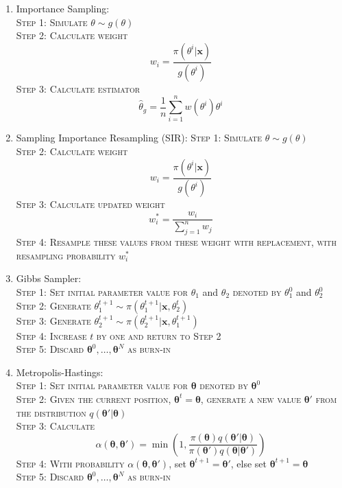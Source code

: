 \documentclass[11pt,a4paper]{article}
\begin{document}
\begin{multicols}{2}
\begin{enumerate}[resume]
\item Importance Sampling: \\
\textsc{Step 1: Simulate} $\theta \sim g(\theta)$ \\
\textsc{Step 2: Calculate weight} $$w_i = \frac{\pi(\theta^i|\boldsymbol x)}{g(\theta^i)}$$
\textsc{Step 3: Calculate estimator} $$\hat\theta_g = \frac{1}{n} \sum_{i=1}^n w(\theta^i) \theta^i$$

\item Sampling Importance Resampling (SIR): 
\textsc{Step 1: Simulate} $\theta \sim g(\theta)$ \\
\textsc{Step 2: Calculate weight} $$w_i = \frac{\pi(\theta^i|\boldsymbol x)}{g(\theta^i)}$$
\textsc{Step 3: Calculate updated weight} $$w_i^* = \frac{w_i}{\sum_{j=1}^n w_j}$$
\textsc{Step 4: Resample these values from these weight with replacement, with resampling probability} $w_i^*$

\item Gibbs Sampler: \\
\textsc{Step 1: Set initial parameter value for} $\theta_1$ and $\theta_2$ \textsc{denoted by} $\theta_1^0$ and $\theta_2^0$ \\
\textsc{Step 2: Generate} $\theta_1^{t+1} \sim \pi(\theta_1^{t+1} | \boldsymbol x, \theta_2^t)$ \\
\textsc{Step 3: Generate} $\theta_2^{t+1} \sim \pi(\theta_2^{t+1} | \boldsymbol x, \theta_1^{t+1})$ \\
\textsc{Step 4: Increase} $t$ \textsc{by one and return to Step 2} \\
\textsc{Step 5: Discard} $\boldsymbol\theta^0, \ldots, \boldsymbol\theta^N$ \textsc{as burn-in}

\item Metropolis-Hastings: \\
\textsc{Step 1: Set initial parameter value for} $\boldsymbol\theta$ \textsc{denoted by} $\boldsymbol\theta^0$ \\
\textsc{Step 2: Given the current position}, $\boldsymbol\theta^t = \boldsymbol\theta$, \textsc{generate a new value} $\boldsymbol\theta'$ \textsc{from the distribution} $q(\boldsymbol\theta'|\boldsymbol\theta)$ \\
\textsc{Step 3: Calculate} 
$$\alpha(\boldsymbol\theta, \boldsymbol\theta') = \min \left( 1, \frac{\pi(\boldsymbol\theta) q(\boldsymbol\theta'|\boldsymbol\theta)}{\pi(\boldsymbol\theta') q(\boldsymbol\theta|\boldsymbol\theta')} \right)$$
\textsc{Step 4: With probability} $\alpha(\boldsymbol\theta, \boldsymbol\theta')$, set $\boldsymbol\theta^{t+1} = \boldsymbol\theta'$, else set $\boldsymbol\theta^{t+1} = \boldsymbol\theta$ \\
\textsc{Step 5: Discard} $\boldsymbol\theta^0, \ldots, \boldsymbol\theta^N$ \textsc{as burn-in}
\end{enumerate}

\end{multicols}
\end{document}
